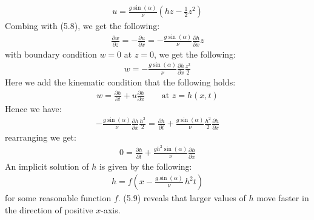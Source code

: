 \documentclass[11pt]{book}
\theoremstyle{break}
\theoremstyle{break}
\newcommand{\pd}{\partial}
\begin{document}
\begin{align*}
u = \frac{g\sin(\alpha)}{\nu}\left( hz - \frac{1}{2}z^2\right)
\end{align*}
Combing with (5.8), we get the following:
\begin{align*}
\frac{\pd w}{\pd z} = -\frac{\pd u}{\pd x} = -\frac{g\sin(\alpha)}{\nu}\frac{\pd h}{\pd x} z
\end{align*}
with boundary condition $w= 0$ at $z = 0$, we get the following:
\begin{align*}
w = -\frac{g\sin(\alpha)}{\nu}\frac{\pd h}{\pd x} \frac{z^2}{2}
\end{align*}
Here we add the kinematic condition that the following holds:
\begin{align*}
w = \frac{\pd h}{\pd t} + u \frac{\pd h}{\pd x} \qquad \text{at }z = h(x,t)
\end{align*}
Hence we have:
\begin{align*}
-\frac{g \sin(\alpha)}{\nu}\frac{\pd h}{\pd x} \frac{h^2}{2} = \frac{\pd h}{\pd t} + \frac{g\sin(\alpha)}{\nu} \frac{h^2}{2} \frac{\pd h}{\pd x}
\end{align*}
rearranging we get:
\begin{align*}
0 = \frac{\pd h}{\pd t} + \frac{gh^2\sin(\alpha)}{\nu}\frac{\pd h}{\pd x} 
\end{align*}
An implicit solution of $h$ is given by the following:
\begin{align}
h = f\left( x - \frac{g\sin(\alpha)}{\nu}\, h^2t\right)
\end{align}
for some reasonable function $f$. (5.9) reveals that larger values of $h$ move faster in the direction of positive $x$-axis. \\
\end{document}
